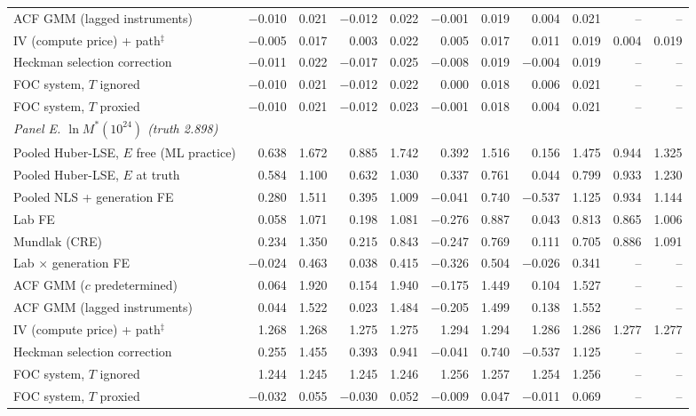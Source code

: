 \begin{table}[!htbp]
\begin{threeparttable}
\begin{tabular}{lrrrrrrrrrr}
ACF GMM (lagged instruments) & $-$0.010 & 0.021 & $-$0.012 & 0.022 & $-$0.001 & 0.019 & 0.004 & 0.021 & -- & -- \\
IV (compute price) + path$^{\ddagger}$ & $-$0.005 & 0.017 & 0.003 & 0.022 & 0.005 & 0.017 & 0.011 & 0.019 & 0.004 & 0.019 \\
Heckman selection correction & $-$0.011 & 0.022 & $-$0.017 & 0.025 & $-$0.008 & 0.019 & $-$0.004 & 0.019 & -- & -- \\
FOC system, $T$ ignored & $-$0.010 & 0.021 & $-$0.012 & 0.022 & 0.000 & 0.018 & 0.006 & 0.021 & -- & -- \\
FOC system, $T$ proxied & $-$0.010 & 0.021 & $-$0.012 & 0.023 & $-$0.001 & 0.018 & 0.004 & 0.021 & -- & -- \\
\midrule
\multicolumn{11}{l}{\textit{Panel E. $\ln M^*(10^{24})$ (truth 2.898)}} \\
Pooled Huber-LSE, $E$ free (ML practice) & 0.638 & 1.672 & 0.885 & 1.742 & 0.392 & 1.516 & 0.156 & 1.475 & 0.944 & 1.325 \\
Pooled Huber-LSE, $E$ at truth & 0.584 & 1.100 & 0.632 & 1.030 & 0.337 & 0.761 & 0.044 & 0.799 & 0.933 & 1.230 \\
Pooled NLS + generation FE & 0.280 & 1.511 & 0.395 & 1.009 & $-$0.041 & 0.740 & $-$0.537 & 1.125 & 0.934 & 1.144 \\
Lab FE & 0.058 & 1.071 & 0.198 & 1.081 & $-$0.276 & 0.887 & 0.043 & 0.813 & 0.865 & 1.006 \\
Mundlak (CRE) & 0.234 & 1.350 & 0.215 & 0.843 & $-$0.247 & 0.769 & 0.111 & 0.705 & 0.886 & 1.091 \\
Lab $\times$ generation FE & $-$0.024 & 0.463 & 0.038 & 0.415 & $-$0.326 & 0.504 & $-$0.026 & 0.341 & -- & -- \\
ACF GMM ($c$ predetermined) & 0.064 & 1.920 & 0.154 & 1.940 & $-$0.175 & 1.449 & 0.104 & 1.527 & -- & -- \\
ACF GMM (lagged instruments) & 0.044 & 1.522 & 0.023 & 1.484 & $-$0.205 & 1.499 & 0.138 & 1.552 & -- & -- \\
IV (compute price) + path$^{\ddagger}$ & 1.268 & 1.268 & 1.275 & 1.275 & 1.294 & 1.294 & 1.286 & 1.286 & 1.277 & 1.277 \\
Heckman selection correction & 0.255 & 1.455 & 0.393 & 0.941 & $-$0.041 & 0.740 & $-$0.537 & 1.125 & -- & -- \\
FOC system, $T$ ignored & 1.244 & 1.245 & 1.245 & 1.246 & 1.256 & 1.257 & 1.254 & 1.256 & -- & -- \\
FOC system, $T$ proxied & $-$0.032 & 0.055 & $-$0.030 & 0.052 & $-$0.009 & 0.047 & $-$0.011 & 0.069 & -- & -- \\

\end{tabular}
\end{threeparttable}
\end{table}
